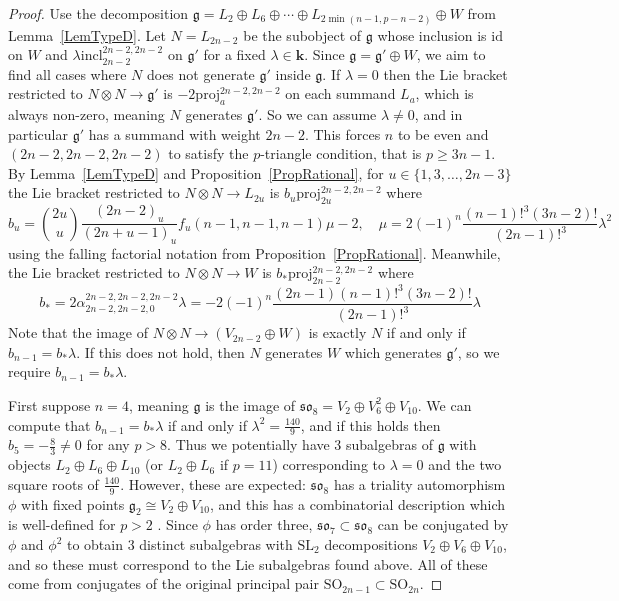 \documentclass[11pt,a4paper,reqno]{amsart}
\theoremstyle{definition}
\newcommand{\bk}{\mathbf{k}}
\numberwithin{equation}{section}
\newcommand{\fg}{\mathfrak{g}}
\newcommand{\fso}{\mathfrak{so}}
\newcommand{\id}{\mathrm{id}}
\newcommand{\SL}{\mathrm{SL}}
\newcommand{\SO}{\mathrm{SO}}
\newcommand{\incl}{\mathrm{incl}}
\newcommand{\proj}{\mathrm{proj}}
\begin{document}
\begin{proof}
Use the decomposition $\fg=L_2\oplus L_6\oplus\cdots\oplus L_{2\min(n-1,p-n-2)}\oplus W$ from Lemma~\ref{LemTypeD}. Let $N=L_{2n-2}$ be the subobject of $\fg$ whose inclusion is $\id$ on $W$ and $\lambda\incl^{2n-2,2n-2}_{2n-2}$ on $\fg'$ for a fixed $\lambda\in\bk$. Since $\fg=\fg'\oplus W$, we aim to find all cases where $N$ does not generate $\fg'$ inside $\fg$. If $\lambda=0$ then the Lie bracket restricted to $N\otimes N\to\fg'$ is $-2\proj^{2n-2,2n-2}_a$ on each summand $L_a$, which is always non-zero, meaning $N$ generates $\fg'$. So we can assume $\lambda\neq0$, and in particular $\fg'$ has a summand with weight $2n-2$. This forces $n$ to be even and $(2n-2,2n-2,2n-2)$ to satisfy the $p$-triangle condition, that is $p\geq3n-1$. By Lemma~\ref{LemTypeD} and Proposition~\ref{PropRational}, for $u\in\{1,3,\dots,2n-3\}$ the Lie bracket restricted to $N\otimes N\to L_{2u}$ is $b_u\proj^{2n-2,2n-2}_{2u}$ where
\[b_u=\binom{2u}{u}\frac{(2n-2)_u}{(2n+u-1)_u}f_u(n-1,n-1,n-1)\mu-2,\quad \mu=2(-1)^n\frac{(n-1)!^3(3n-2)!}{(2n-1)!^3}\lambda^2\]
using the falling factorial notation from Proposition~\ref{PropRational}. Meanwhile, the Lie bracket restricted to $N\otimes N\to W$ is $b_*\proj^{2n-2,2n-2}_{2n-2}$ where
\[b_*=2\alpha^{2n-2,2n-2,2n-2}_{2n-2,2n-2,0}\lambda=-2(-1)^n\frac{(2n-1)(n-1)!^3(3n-2)!}{(2n-1)!^3}\lambda\]
Note that the image of $N\otimes N\to(V_{2n-2}\oplus W)$ is exactly $N$ if and only if $b_{n-1}=b_*\lambda$. If this does not hold, then $N$ generates $W$ which generates $\fg'$, so we require $b_{n-1}=b_*\lambda$.

First suppose $n=4$, meaning $\fg$ is the image of $\fso_8=V_2\oplus V_6^2\oplus V_{10}$. We can compute that $b_{n-1}=b_*\lambda$ if and only if $\lambda^2=\frac{140}9$, and if this holds then $b_5=-\frac 83\neq0$ for any $p>8$. Thus we potentially have 3 subalgebras of $\fg$ with objects $L_2\oplus L_6\oplus L_{10}$ (or $L_2\oplus L_6$ if $p=11$) corresponding to $\lambda=0$ and the two square roots of $\frac{140}9$. However, these are expected: $\fso_8$ has a triality automorphism $\phi$ with fixed points $\fg_2\cong V_2\oplus V_{10}$, and this has a combinatorial description which is well-defined for $p>2$ \cite{MW}. Since $\phi$ has order three, $\fso_7\subset\fso_8$ can be conjugated by $\phi$ and $\phi^2$ to obtain 3 distinct subalgebras with $\SL_2$ decompositions $V_2\oplus V_6\oplus V_{10}$, and so these must correspond to the Lie subalgebras found above. All of these come from conjugates of the original principal pair $\SO_{2n-1}\subset\SO_{2n}$.


\end{proof}
\end{document}
